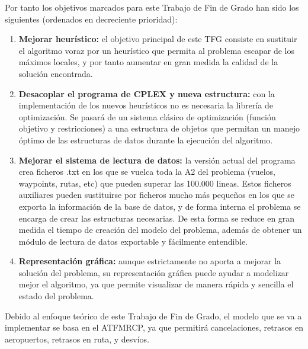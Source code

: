 Por tanto los objetivos marcados para este Trabajo de Fin de Grado han sido los siguientes (ordenados en decreciente prioridad):
\begin{enumerate}
	\item \textbf{Mejorar heurístico: }el objetivo principal de este TFG consiste en sustituir el algoritmo voraz por un heurístico que permita al problema escapar de los máximos locales, y por tanto aumentar en gran medida la calidad de la solución encontrada.
	\item \textbf{Desacoplar el programa de CPLEX y nueva estructura: }con la implementación de los nuevos heurísticos no es necesaria la librería de optimización. Se pasará de un sistema clásico de optimización (función objetivo y restricciones) a una estructura de objetos que permitan un manejo óptimo de las estructuras de datos durante la ejecución del algoritmo.
	\item \textbf{Mejorar el sistema de lectura de datos: }la versión actual del programa crea ficheros .txt en los que se vuelca toda la A2 del problema (vuelos, waypoints, rutas, etc) que pueden superar las 100.000 lineas. Estos ficheros auxiliares pueden sustituirse por ficheros mucho más pequeños en los que se exporta la información de la base de datos, y de forma interna el problema se encarga de crear las estructuras necesarias. De esta forma se reduce en gran medida el tiempo de creación del modelo del problema, además de obtener un módulo de lectura de datos exportable y fácilmente entendible.
	\item \textbf{Representación gráfica: }aunque estrictamente no aporta a mejorar la solución del problema, su representación gráfica puede ayudar a modelizar mejor el algoritmo, ya que permite visualizar de manera rápida y sencilla el estado del problema.
\end{enumerate}

Debido al enfoque teórico de este Trabajo de Fin de Grado, el modelo que se va a implementar se basa en el ATFMRCP, ya que permitirá cancelaciones, retrasos en aeropuertos, retrasos en ruta, y desvíos. 